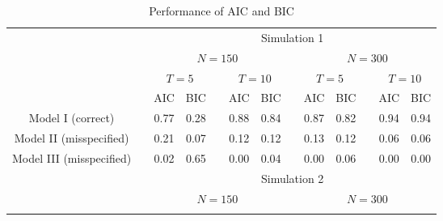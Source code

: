 \documentclass[12pt]{article}
\begin{document}
\begin{table}
\footnotesize
\renewcommand\thetable{C2b}
\caption{Performance of \textsc{AIC} and \textsc{BIC}}
\label{C2b}
\centering
\begin{tabular}{ccccccccccccc}
\noalign{\vspace{0.2cm}}
\hline
\hline
\noalign{\vspace{0.2cm}}
 && \multicolumn{11}{c}{Simulation 1}\\
\noalign{\vspace{0.1cm}}
\hline
\noalign{\vspace{0.2cm}}
&& \multicolumn{5}{c}{$N = 150$} && \multicolumn{5}{c}{$N = 300$}\\
\noalign{\vspace{0.1cm}}
\cline{3-7}\cline{9-13}
\noalign{\vspace{0.1cm}}
&& \multicolumn{2}{c}{$T = 5$} && \multicolumn{2}{c}{$T = 10$} && \multicolumn{2}{c}{$T = 5$} && \multicolumn{2}{c}{$T = 10$}\\
\cline{3-4}\cline{6-7}\cline{9-10}\cline{12-13}
\noalign{\vspace{0.1cm}}
&& \textsc{AIC} & \textsc{BIC} && \textsc{AIC} & \textsc{BIC} && \textsc{AIC} & \textsc{BIC} && \textsc{AIC} & \textsc{BIC}\\
\noalign{\vspace{0.1cm}}
Model I (correct) && 				0.77 & 0.28 && 0.88 & 0.84 && 0.87 & 0.82 && 0.94 & 0.94\\
Model II (misspecified) &&			0.21 & 0.07 && 0.12 & 0.12 && 0.13 & 0.12 && 0.06 & 0.06\\
Model III (misspecified) &&		0.02 & 0.65 && 0.00 & 0.04 && 0.00 & 0.06 && 0.00 & 0.00\\
\noalign{\vspace{0.2cm}}
\hline
\hline
\noalign{\vspace{0.2cm}}
 && \multicolumn{11}{c}{Simulation 2}\\
\noalign{\vspace{0.1cm}}
\hline
\noalign{\vspace{0.2cm}}
&& \multicolumn{5}{c}{$N = 150$} && \multicolumn{5}{c}{$N = 300$}\\
\noalign{\vspace{0.1cm}}

\end{tabular}
\end{table}
\end{document}
